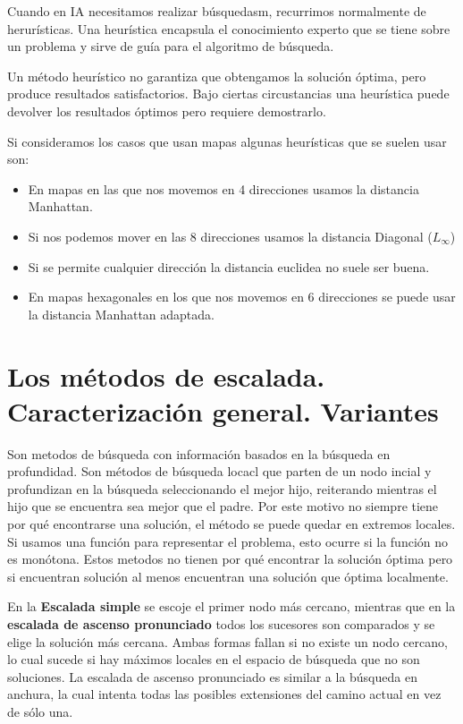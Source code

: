 \documentclass[12pt]{article}
\begin{document}
Cuando en IA necesitamos realizar búsquedasm, recurrimos normalmente
de herurísticas. Una heurística encapsula el conocimiento experto que
se tiene sobre un problema y sirve de guía para el algoritmo de
búsqueda.

Un método heurístico no garantiza que obtengamos la solución óptima,
pero produce resultados satisfactorios. Bajo ciertas circustancias una
heurística puede devolver los resultados óptimos pero requiere
demostrarlo.

Si consideramos los casos que usan mapas algunas heurísticas que se
suelen usar son:

\begin{itemize}
\item En mapas en las que nos movemos en 4 direcciones usamos la
  distancia Manhattan.
\item Si nos podemos mover en las 8 direcciones usamos la distancia Diagonal ($L_\infty$)
\item Si se permite cualquier dirección la distancia euclidea no suele ser buena.
\item En mapas hexagonales en los que nos movemos en 6 direcciones se
  puede usar la distancia Manhattan adaptada.
\end{itemize}

\section{Los métodos de escalada. Caracterización general. Variantes}

Son metodos de búsqueda con información basados en la búsqueda en
profundidad. Son métodos de búsqueda locacl que parten de un nodo
incial y profundizan en la búsqueda seleccionando el mejor hijo,
reiterando mientras el hijo que se encuentra sea mejor que el padre.
Por este motivo no siempre tiene por qué encontrarse una solución, el
método se puede quedar en extremos locales. Si usamos una función para
representar el problema, esto ocurre si la función no es
monótona. Estos metodos no tienen por qué encontrar la solución óptima
pero si encuentran solución al menos encuentran una solución que
óptima localmente.

En la \textbf{Escalada simple} se escoje el primer nodo más cercano,
mientras que en la \textbf{escalada de ascenso pronunciado} todos los
sucesores son comparados y se elige la solución más cercana. Ambas
formas fallan si no existe un nodo cercano, lo cual sucede si hay
máximos locales en el espacio de búsqueda que no son soluciones. La
escalada de ascenso pronunciado es similar a la búsqueda en anchura,
la cual intenta todas las posibles extensiones del camino actual en
vez de sólo una.
\end{document}
